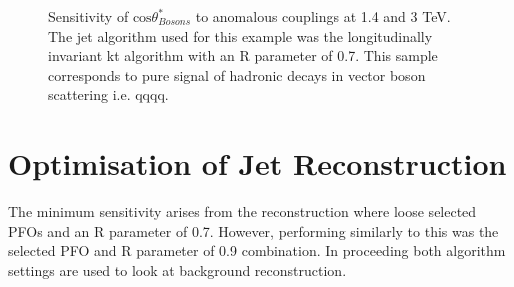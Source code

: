 \begin{figure}
\caption[Sensitivity of $\text{cos}\theta^{8}_{Bosons}$ to the anomalous gauge couplings $\alpha_{4}$ and $\alpha_{5}$ at 1.4 and 3 TeV.]{Sensitivity of $\text{cos}\theta^{*}_{Bosons}$ to anomalous couplings at 1.4 and 3 TeV. The jet algorithm used for this example was the longitudinally invariant kt algorithm with an R parameter of 0.7. This sample corresponds to pure signal of hadronic decays in vector boson scattering i.e. \nu{\nu}qqqq.}
\label{fig:costhetastarbosons}
\end{figure}

\section{Optimisation of Jet Reconstruction}

The minimum sensitivity arises from the reconstruction where loose selected PFOs and an R parameter of 0.7.  However, performing similarly to this was the selected PFO and R parameter of 0.9 combination.  In proceeding both algorithm settings are used to look at background reconstruction.




